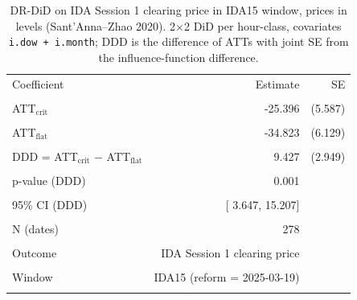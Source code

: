 \begin{table}[H]\centering\small
\caption{DR-DiD on IDA Session 1 clearing price in IDA15 window, prices in levels (Sant'Anna--Zhao 2020). 2$\times$2 DiD per hour-class, covariates \texttt{i.dow + i.month}; DDD is the difference of ATTs with joint SE from the influence-function difference.}\label{tab:reform_csdid_ida15_ida}
\begin{tabular}{lrr}
\toprule
Coefficient & Estimate & SE \\\\
\midrule
ATT$_{\text{crit}}$ & -25.396 & (5.587) \\\\
ATT$_{\text{flat}}$ & -34.823 & (6.129) \\\\
DDD = ATT$_{\text{crit}}$ $-$ ATT$_{\text{flat}}$ &   9.427 & (2.949) \\\\
\midrule
p-value (DDD)        & 0.001 & \\\\
95\% CI (DDD)        & [  3.647,  15.207] & \\\\
N (dates)            &   278 & \\\\
Outcome              & IDA Session 1 clearing price & \\\\
Window               & IDA15 (reform = 2025-03-19) & \\\\
\bottomrule
\end{tabular}
\end{table}
